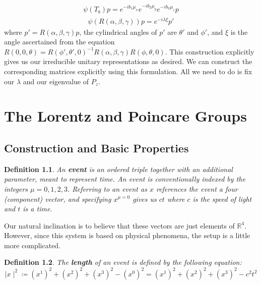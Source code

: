 \documentclass[10pt]{ucthesis}
\newcommand{\R}{\mathbb{R}}
\newtheorem{definition}{Definition}[chapter]
\begin{document}
\begin{equation}
\begin{aligned}
	\psi(T_b) p = e^{-ib_1\mu_x}e^{-ib_2\mu_y}e^{-ib_3\mu_z}p
\end{aligned}
\end{equation}
\begin{equation}
\begin{aligned}
	\psi(R(\alpha,\beta,\gamma)) p = e^{-i\lambda\xi}p'
\end{aligned}
\end{equation}
where $p' = R(\alpha,\beta,\gamma)p$, the cylindrical angles of $p'$ are $\theta'$ and $\phi'$, and $\xi$ is the angle ascertained from the equation $R(0,0,\theta)=R(\phi',\theta',0)^{-1}R(\alpha,\beta,\gamma) R(\phi,\theta,0)$. This construction explicitly gives us our irreducible unitary representations as desired. We can construct the corresponding matrices explicitly using this formulation. All we need to do is fix our $\lambda$ and our eigenvalue of $P_z$.


\chapter{The Lorentz and Poincare Groups}

\section{Construction and Basic Properties}

\begin{definition}
	An \textbf{event} is an ordered triple together with an additional parameter, meant to represent time. An event is conventionally indexed by the integers $\mu = 0,1,2,3$. Referring to an event as $x$ references the event a four (component) vector, and specifying $x^{\mu=0}$ gives us $ct$ where $c$ is the speed of light and $t$ is a time. 
\end{definition}

Our natural inclination is to believe that these vectors are just elements of $\R^4$. However, since this system is based on physical phenomena, the setup is a little more complicated.

\begin{definition}
	The \textbf{length} of an event is defined by the following equation:
$$\mid x\mid^2 \coloneq (x^1)^2+(x^2)^2+(x^3)^2 - (x^0)^2 = (x^1)^2+(x^2)^2+(x^3)^2 - c^2t^2$$
\end{definition}
\end{document}
